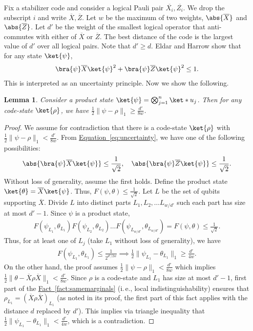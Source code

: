 \documentclass[11pt]{article}
\newcommand{\expref}[2]{\texorpdfstring{\hyperref[#2]{#1~\ref{#2}}}{#1~\ref{#2}}}
\newcommand{\expeqref}[2]{\texorpdfstring{\hyperref[#2]{#1~\eqref{#2}}}{#1~\eqref{#2}}}
\newtheorem{lemma}[theorem]{Lemma}
\newcommand{\ie}{i.\,e.}
\begin{document}
Fix a stabilizer code and consider a logical Pauli pair $\overline{X_i},\overline{Z_i}$. We drop the subscript $i$ and write $\overline{X},\overline{Z}$.
%
%
%
%
Let $w$ be the maximum of two weights, $\abs{\overline{X}}$ and $\abs{\overline{Z}}$. 
Let $d'$ be the weight of the smallest logical operator that anti-commutes with either of $\overline{X}$ or $\overline{Z}$. The best distance of the code is the largest value of $d'$ over all logical pairs. Note that $d'\geq d$. Eldar and Harrow \cite[Section 4: Lemma 37]{8104078} show that for any state $\ket{\psi}$, 
\begin{equation}
\label{eq:uncertainty}
\bra{\psi}\overline{X}\ket{\psi}^2 + \bra{\psi}\overline{Z}\ket{\psi}^2 \leq 1.
\end{equation} 
This is interpreted as an uncertainty principle. Now we show the following.
\begin{lemma}
Consider a product state $\ket{\psi}= \bigotimes_{j = 1}^n \ket*{u_j}$. Then for any code-state $\ket{\rho}$, we have $\frac{1}{2}\|\psi-\rho\|_1\geq \frac{d'}{8w}$.
\end{lemma}
\begin{proof}
We assume for contradiction that there is a code-state $\ket{\rho}$ with $\frac{1}{2}\|\psi-\rho\|_1< \frac{d'}{8w}$.  From  %
\expeqref{Equation}{eq:uncertainty}, we have one of the following possibilities:
\begin{align}
\abs{\bra{\psi}\overline{X}\ket{\psi}}\leq \frac{1}{\sqrt{2}}, \quad \abs{\bra{\psi}\overline{Z}\ket{\psi}}\leq \frac{1}{\sqrt{2}}.    
\end{align}
Without loss of generality, assume the first holds.  Define the product state $\ket{\theta}=\overline{X}\ket{\psi}$. Thus, $F(\psi, \theta)\leq \frac{1}{\sqrt{2}}$. Let $L$ be the set of qubits supporting $\overline{X}$. Divide $L$ into distinct parts $L_1,L_2, \ldots L_{w/d'}$ such each part has size at most $d'-1$. Since $\psi$ is a product state, 
\begin{align}F(\psi_{L_1}, \theta_{L_1})F(\psi_{L_2}, \theta_{L_2})\ldots F(\psi_{L_{w/d'}}, \theta_{L_{w/d'}})=F(\psi, \theta)\leq \frac{1}{\sqrt{2}}.
\end{align} 
Thus, for at least one of $L_j$ (take $L_1$ without loss of generality), we have
\begin{align}F(\psi_{L_1}, \theta_{L_1})\leq \frac{1}{2^{d'/2w}}\implies \frac{1}{2}\|\psi_{L_1}- \theta_{L_1}\|_1 \geq \frac{d'}{4w}.
\end{align}
On the other hand, the proof assumes $\frac{1}{2}\|\psi-\rho\|_1< \frac{d'}{8w}$ which implies $\frac{1}{2}\|\theta-\overline{X}\rho \overline{X}\|_1< \frac{d'}{8w}$. Since $\rho$ is a code-state and $L_1$ has size at most $d'-1$, first part of the \expref{Fact}{fact:samemarginals} (\ie, local indistinguishability) ensures that $\rho_{L_1}=(\overline{X}\rho \overline{X})_{L_1}$ (as noted in its proof, the first part of this fact applies with the distance $d$ replaced by $d'$). This implies via triangle inequality that $\frac{1}{2}\|\psi_{L_1}-\theta_{L_1}\|_1< \frac{d'}{4w}$, which is a contradiction.
\end{proof}
\end{document}
